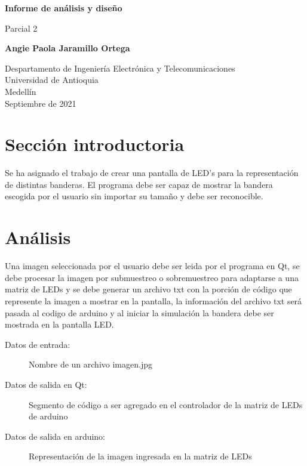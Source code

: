 \documentclass{article}
\begin{document}
\begin{titlepage}
    \begin{center}
        \vspace*{1cm}
            
        \Huge
        \textbf{Informe de análisis y diseño}
            
        \vspace{0.5cm}
        \LARGE
        Parcial 2
            
        \vspace{1.5cm}
            
        \textbf{Angie Paola Jaramillo Ortega}
            
        \vfill
            
        \vspace{0.8cm}
            
        \Large
        Despartamento de Ingeniería Electrónica y Telecomunicaciones\\
        Universidad de Antioquia\\
        Medellín\\
        Septiembre de 2021
            
    \end{center}
\end{titlepage}

\tableofcontents
\newpage
\section{Sección introductoria}\label{intro}
Se ha asignado el trabajo de crear una pantalla de LED's para la representación de distintas banderas. El programa debe ser capaz de mostrar la bandera escogida por el usuario sin importar su tamaño y debe ser reconocible.

\section{Análisis} \label{Análisis}
Una imagen seleccionada por el usuario debe ser leida por el programa en Qt, se debe procesar la imagen por submuestreo o sobremuestreo para adaptarse a una matriz de LEDs y se debe generar un archivo txt con la porción de código que represente la imagen a mostrar en la pantalla, la información del archivo txt será pasada al codigo de arduino y al iniciar la simulación la bandera debe ser mostrada en la pantalla LED.

\begin{description}
   \item[Datos de entrada:] Nombre de un archivo imagen.jpg 
   \item[Datos de salida en Qt:] Segmento de código a ser agregado en el controlador de la matriz de LEDs de arduino 
   \item[Datos de salida en arduino:] Representación de la imagen ingresada en la matriz de LEDs
\end{description}
\end{document}
